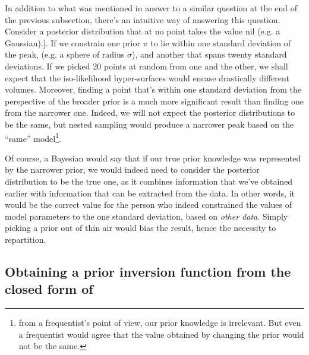 \documentclass[usenatbib]{mnras}
\begin{document}
In addition to what was mentioned in answer to a similar question
at the end of the previous subsection, there's an intuitive way of
answering this question. Consider a posterior distribution that at
no point takes the value nil (e.g. a Gaussian).]. If we constrain one
prior \(\pi\) to lie within one standard deviation of the peak,
(e.g. a sphere of radius \(\sigma\)), and another that spans twenty
standard deviations. If we picked 20 points at random from one and
the other, we shall expect that the iso-likelihood hyper-surfaces
would encase drastically different volumes. Moreover, finding a
point that's within one standard deviation from the perspective of
the broader prior is a much more significant result than finding
one from the narrower one. Indeed, we will not expect the posterior
distributions to be the same, but nested sampling would produce a
narrower peak based on the ``same'' model\footnote{from a frequentist's point of view, our prior knowledge is
irrelevant. But even a frequentist would agree that the value obtained
by changing the prior would not be the same.}. 

Of course, a Bayesian would say that if our true prior knowledge
was represented by the narrower prior, we would indeed need to
consider the posterior distribution to be the true one, as it
combines information that we've obtained earlier with information
that can be extracted from the data. In other words, it would be
the correct value for the person who indeed constrained the values
of model parameters to the one standard deviation, based on \emph{other
data}. Simply picking a prior out of thin air would bias the
result, hence the necessity to repartition. 



\subsection{Obtaining a prior inversion function from the closed form of}
\label{sec:org30d103a}
\end{document}
